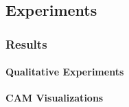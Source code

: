 \subsection*{Experiments}
%        
%    
\begin{frame}[t]
    \frametitle{Results}
    \framesubtitle{Qualitative Experiments}
    \small
    \textbf{CAM  Visualizations}
    \begin{center}
        
    \end{center}
    
\end{frame}
